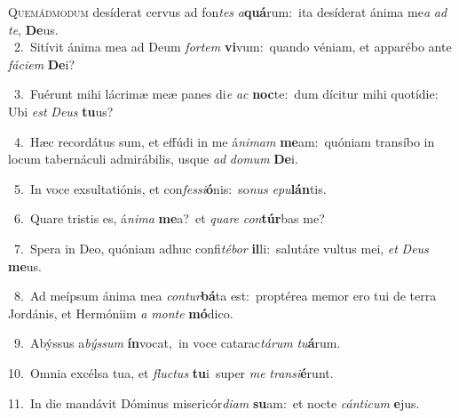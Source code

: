 \lettrine{\initial\textcolor{\initialcolor}{Q}}{uemádmodum} desíderat cervus ad fon\textit{tes} \textit{a}\-\textbf{quá}rum:~\star ita desíderat ánima me\textit{a} \textit{ad} \textit{te}\-, \textbf{De}\-us.\\
{\numbfont\textcolor{\numbcolor}{~2.}}~Sitívit ánima mea ad Deum \textit{for}\-\textit{tem} \textbf{vi}\-vum:~\star quando véniam, et apparébo ante \textit{fá}\-\textit{ci}\textit{em} \textbf{De}\-i?\par
{\numbfont\textcolor{\numbcolor}{~3.}}~Fuérunt mihi lácrimæ meæ panes di\textit{e} \textit{ac} \textbf{noc}\-te:~\star dum dícitur mihi quotídie: Ubi \textit{est} \textit{De}\-\textit{us} \textbf{tu}\-us?\par
{\numbfont\textcolor{\numbcolor}{~4.}}~Hæc recordátus sum, et effúdi in me á\-\textit{ni}\-\textit{mam} \textbf{me}\-am:~\star quóniam transíbo in locum tabernáculi admirábilis, usque \textit{ad} \textit{do}\-\textit{mum} \textbf{De}\-i.\par
{\numbfont\textcolor{\numbcolor}{~5.}}~In voce exsultatiónis, et con\-\textit{fes}\-\textit{si}\textbf{ó}nis:~\star so\textit{nus} \textit{e}\-\textit{pu}\textbf{lán}tis.\par
{\numbfont\textcolor{\numbcolor}{~6.}}~Quare tristis es, á\-\textit{ni}\-\textit{ma} \textbf{me}\-a?~\star et \textit{qua}\-\textit{re} \textit{con}\-\textbf{túr}bas me?\par
{\numbfont\textcolor{\numbcolor}{~7.}}~Spera in Deo, quóniam adhuc confi\-\textit{té}\-\textit{bor} \textbf{il}\-li:~\star salutáre vultus mei, \textit{et} \textit{De}\-\textit{us} \textbf{me}\-us.\par
{\numbfont\textcolor{\numbcolor}{~8.}}~Ad meípsum ánima mea \textit{con}\-\textit{tur}\textbf{bá}ta est:~\star proptérea memor ero tui de terra Jordánis, et Hermóniim \textit{a} \textit{mon}\-\textit{te} \textbf{mó}\-dico.\par
{\numbfont\textcolor{\numbcolor}{~9.}}~Abýssus a\-\textit{býs}\-\textit{sum} \textbf{ín}\-vocat,~\star in voce catarac\-\textit{tá}\-\textit{rum} \textit{tu}\-\textbf{á}rum.\par
{\numbfont\textcolor{\numbcolor}{10.}}~Omnia excélsa tua, et \textit{fluc}\-\textit{tus} \textbf{tu}\-i~\star super \textit{me} \textit{trans}\-\textit{i}\textbf{é}runt.\par
{\numbfont\textcolor{\numbcolor}{11.}}~In die mandávit Dóminus misericór\-\textit{di}\-\textit{am} \textbf{su}\-am:~\star et nocte \textit{cán}\-\textit{ti}\textit{cum} \textbf{e}\-jus.\par
